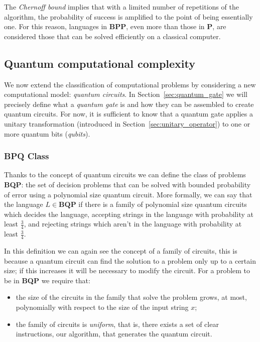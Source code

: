 The \emph{Chernoff bound} implies that with a limited number of repetitions of the algorithm, the probability of success is amplified to the point of being essentially one. For this reason, languages in \textbf{BPP}, even more than those in \textbf{P}, are considered those that can be solved efficiently on a classical computer.

\subsection{Quantum computational complexity}
We now extend the classification of computational problems by considering a new computational model: \emph{quantum circuits}. In Section~\ref{sec:quantum_gate} we will precisely define what a \emph{quantum gate} is and how they can be assembled to create quantum circuits. For now, it is sufficient to know that a quantum gate applies a unitary transformation (introduced in Section~\ref{sec:unitary_operator}) to one or more quantum bits (\emph{qubits}).

\subsubsection*{BPQ Class}
Thanks to the concept of quantum circuits we can define the class of problems \textbf{BQP}: the set of decision problems that can be solved with bounded probability of error using a polynomial size quantum circuit. More formally, we can say that the language $L \in \textbf{BQP}$ if there is a family of polynomial size quantum circuits which decides the language, accepting strings in the language with probability at least $\frac{3}{4}$, and rejecting strings which aren’t in the language with probability at least $\frac{3}{4}$.

In this definition we can again see the concept of a family of circuits, this is because a quantum circuit can find the solution to a problem only up to a certain size; if this increases it will be necessary to modify the circuit. For a problem to be in \textbf{BQP} we require that:
\begin{itemize}
	\item the size of the circuits in the family that solve the problem grows, at most, polynomially with respect to the size of the input string $x$;
	\item the family of circuits is \emph{uniform}, that is, there exists a set of clear instructions, our algorithm, that generates the quantum circuit.
\end{itemize}

